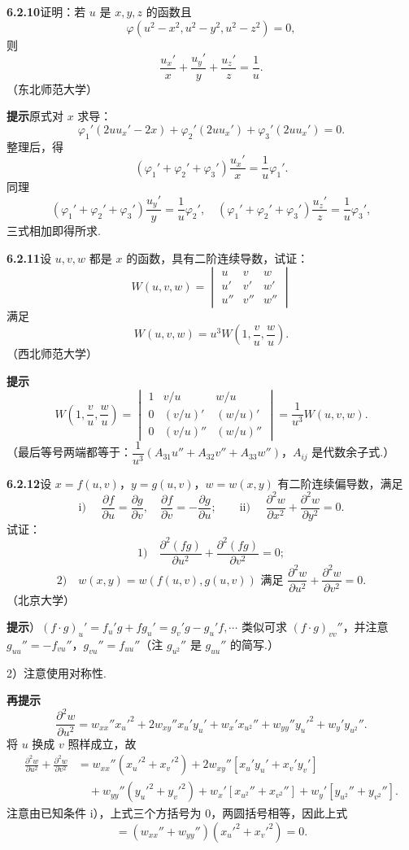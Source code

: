 \documentclass[UTF8, 12pt, fontset=fandol, oneside]{ctexart}
\begin{document}
\noindent\textbf{6.2.10}\quad 证明：若 $u$ 是 $x,y,z$ 的函数且
\[
  \varphi(u^2-x^2,u^2-y^2,u^2-z^2)=0,
\]
则
\[
  \frac{u_x'}x+\frac{u_y'}y+\frac{u_z'}z=\frac1u.
\]
（东北师范大学）

\noindent\textbf{提示}\quad 原式对 $x$ 求导：
\[
  \varphi_1'(2uu_x'-2x)+\varphi_2'(2uu_x')+\varphi_3'(2uu_x')=0.
\]
整理后，得
\[
  (\varphi_1'+\varphi_2'+\varphi_3')\frac{u_x'}x=\frac1u\varphi_1'.
\]
同理
\[
  (\varphi_1'+\varphi_2'+\varphi_3')\frac{u_y'}y=\frac1u\varphi_2',\quad
  (\varphi_1'+\varphi_2'+\varphi_3')\frac{u_z'}z=\frac1u\varphi_3',
\]
三式相加即得所求.

\noindent\textbf{6.2.11}\quad 设 $u,v,w$ 都是 $x$ 的函数，具有二阶连续导数，试证：
\[
  W(u,v,w)=
  \begin{vmatrix}
  u&v&w\\
  u'&v'&w'\\
  u''&v''&w''
  \end{vmatrix}
\]
满足
\[
  W(u,v,w)=u^3W\left(1,\frac vu,\frac wu\right).
\]
（西北师范大学）

\noindent\textbf{提示}\quad
\[
  W\left(1,\frac vu,\frac wu\right)=
  \begin{vmatrix}
  1&v/u&w/u\\
  0&(v/u)'&(w/u)'\\
  0&(v/u)''&(w/u)''
  \end{vmatrix}
  =\frac1{u^3}W(u,v,w).
\]
（最后等号两端都等于：$\dfrac1{u^3}(A_{31}u''+A_{32}v''+A_{33}w'')$，$A_{ij}$ 是代数余子式.）

\noindent\textbf{6.2.12}\quad 设 $x=f(u,v)$，$y=g(u,v)$，$w=w(x,y)$ 有二阶连续偏导数，满足
\[
  \text{i) }\quad \frac{\partial f}{\partial u}=\frac{\partial g}{\partial v},\quad
  \frac{\partial f}{\partial v}=-\frac{\partial g}{\partial u};
  \qquad
  \text{ii) }\quad
  \frac{\partial^2w}{\partial x^2}+\frac{\partial^2w}{\partial y^2}=0.
\]
试证：
\[
  1)\quad \frac{\partial^2(fg)}{\partial u^2}+\frac{\partial^2(fg)}{\partial v^2}=0;
\]
\[
  2)\quad w(x,y)=w(f(u,v),g(u,v))\text{ 满足 }
  \frac{\partial^2w}{\partial u^2}+\frac{\partial^2w}{\partial v^2}=0.
\]
（北京大学）

\noindent\textbf{提示}）$(f\cdot g)_u'=f_u'g+fg_u'=g_v'g-g_u'f,\cdots$ 类似可求 $(f\cdot g)_{vv}''$，并注意 $g_{uu}''=-f_{vu}''$，$g_{vu}''=f_{uu}''$（注 $g_{u^2}''$ 是 $g_{uu}''$ 的简写.）

2）注意使用对称性.

\noindent\textbf{再提示}\quad
\[
  \frac{\partial^2w}{\partial u^2}
  =w_{xx}''x_u'^2+2w_{xy}''x_u'y_u'+w_x'x_{u^2}''
  +w_{yy}''y_u'^2+w_y'y_{u^2}''.
\]
将 $u$ 换成 $v$ 照样成立，故
\[
\begin{aligned}
\frac{\partial^2w}{\partial u^2}+\frac{\partial^2w}{\partial v^2}
&=w_{xx}''(x_u'^2+x_v'^2)+2w_{xy}''[x_u'y_u'+x_v'y_v']\\
&\quad+w_{yy}''(y_u'^2+y_v'^2)+w_x'[x_{u^2}''+x_{v^2}'']
+w_y'[y_{u^2}''+y_{v^2}''].
\end{aligned}
\]
注意由已知条件 i），上式三个方括号为 $0$，两圆括号相等，因此上式
\[
  =(w_{xx}''+w_{yy}'')(x_u'^2+x_v'^2)=0.
\]
\end{document}
